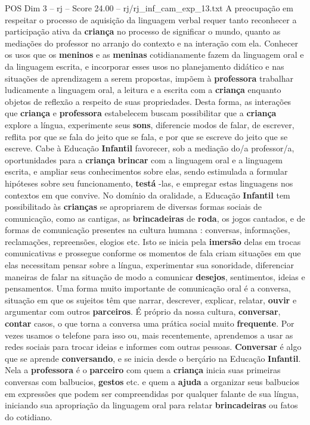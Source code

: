 \begin{textsample}{POS Dim 3 – rj – Score 24.00 – rj/rj\_inf\_cam\_exp\_13.txt}
A preocupação em respeitar o processo de aquisição da linguagem verbal requer tanto reconhecer a participação ativa da \textbf{criança} no processo de significar o mundo, quanto as mediações do professor no arranjo do contexto e na interação com ela.
Conhecer os usos que os \textbf{meninos} e as \textbf{meninas} cotidianamente fazem da linguagem oral e da linguagem escrita, e incorporar esses usos no planejamento didático e nas situações de aprendizagem a serem propostas, impõem à \textbf{professora} trabalhar ludicamente a linguagem oral, a leitura e a escrita com a \textbf{criança} enquanto objetos de reflexão a respeito de suas propriedades.
Desta forma, as interações que \textbf{criança} e \textbf{professora} estabelecem buscam possibilitar que a \textbf{criança} explore a língua, experimente seus \textbf{sons}, diferencie modos de falar, de escrever, reflita por que se fala do jeito que se fala, e por que se escreve do jeito que se escreve.
Cabe à Educação \textbf{Infantil} favorecer, sob a mediação do/a professor/a, oportunidades para a \textbf{criança} \textbf{brincar} com a linguagem oral e a linguagem escrita, e ampliar seus conhecimentos sobre elas, sendo estimulada a formular hipóteses sobre seu funcionamento, \textbf{testá} -las, e empregar estas linguagens nos contextos em que convive.
No domínio da oralidade, a Educação \textbf{Infantil} tem possibilitado às \textbf{crianças} se apropriarem de diversas formas sociais de comunicação, como as cantigas, as \textbf{brincadeiras} de \textbf{roda}, os jogos cantados, e de formas de comunicação presentes na cultura humana : conversas, informações, reclamações, repreensões, elogios etc.
Isto se inicia pela \textbf{imersão} delas em trocas comunicativas e prossegue conforme os momentos de fala criam situações em que elas necessitam pensar sobre a língua, experimentar sua sonoridade, diferenciar maneiras de falar na situação de modo a comunicar \textbf{desejos}, sentimentos, ideias e pensamentos.
Uma forma muito importante de comunicação oral é a conversa, situação em que os sujeitos têm que narrar, descrever, explicar, relatar, \textbf{ouvir} e argumentar com outros \textbf{parceiros}.
É próprio da nossa cultura, \textbf{conversar}, \textbf{contar} casos, o que torna a conversa uma prática social muito \textbf{frequente}.
Por vezes usamos o telefone para isso ou, mais recentemente, aprendemos a usar as redes sociais para trocar ideias e informes com outras pessoas. \textbf{Conversar} é algo que se aprende \textbf{conversando}, e se inicia desde o berçário na Educação \textbf{Infantil}.
Nela a \textbf{professora} é o \textbf{parceiro} com quem a \textbf{criança} inicia suas primeiras conversas com balbucios, \textbf{gestos} etc. e quem a \textbf{ajuda} a organizar seus balbucios em expressões que podem ser compreendidas por qualquer falante de sua língua, iniciando sua apropriação da linguagem oral para relatar \textbf{brincadeiras} ou fatos do cotidiano.

\end{textsample}
